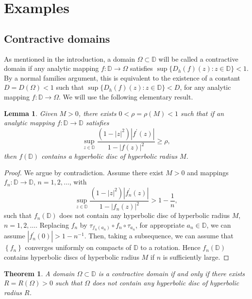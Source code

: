 \documentclass[a4paper,12pt]{article}
\newtheorem{theorem}{Theorem}[section]
\newtheorem{lem}{Lemma}[section]
\theoremstyle{definition}
\numberwithin{equation}{section}
\newcommand{\D}{\mathbb D}
\begin{document}
\section{Examples}\label{section5}

\subsection{Contractive domains}

As mentioned in the introduction, a domain $\Omega \subset  \mathbb{D}$ will be called a contractive domain if any analytic mapping $f: \D \rightarrow \Omega$ satisfies $\sup \{D_h (f) (z) : z \in \D\} < 1$. By a normal families argument, this is equivalent to the existence of a constant $D=D(\Omega)<1$ such that $\sup \{D_h (f) (z) : z \in \D\} <D$, for any analytic mapping $f: \mathbb{D} \rightarrow \Omega$. We will use the following elementary result.

\begin{lem}
    \label{2contractivedomain}
    Given $M>0$, there exists $0<\rho=\rho(M)<1$ such that if an analytic mapping $f: \D \rightarrow \mathbb{D}$ satisfies
$$
\sup _{z \in \mathbb{D}} \frac{\left(1-|z|^{2}\right)\left|f^{\prime}(z)\right|}{1-|f(z)|^{2}} \geqslant \rho , 
$$
then $f(\D)$ contains a hyperbolic disc of hyperbolic radius $M$.
\end{lem}

\begin{proof}
We argue by contradiction. Assume there exist $M>0$ and mappings $f_{n} : \mathbb{D} \rightarrow \mathbb{D}$, $n=1,2,\ldots$, with
$$
\sup _{z \in \mathbb{D}} \frac{\left(1-|z|^{2}\right) |f_{n}^{\prime} (z) |}{1-\left|f_{n}(z)\right|^{2}}>1-\frac{1}{n} , 
$$
such that $f_{n}(\D)$ does not contain any hyperbolic disc of hyperbolic radius $M$, $n=1,2,\ldots$. Replacing $f_{n}$ by $\tau_{f_n(a_n)} \circ f_{n} \circ \tau_{a_n} $, for appropriate $ a_{n} \in \D$, we can assume $\left|f_{n}^{\prime}(0)\right|>1- n^{-1}$. Then, taking a subsequence, we can assume that $\left\{f_{n}\right\}$ converges uniformly on compacts of $\D$ to a rotation. Hence $f_{n}(\D)$ contains hyperbolic discs of hyperbolic radius $M$ if $n$ is sufficiently large.
\end{proof}

\medskip

\begin{theorem}
    \label{contractivedomain}
    A domain $\Omega \subset \D$ is a contractive domain if and only if there exists $R=R(\Omega) >0$ such that $\Omega$ does not contain any hyperbolic disc of hyperbolic radius $R$.  
\end{theorem}
\end{document}
